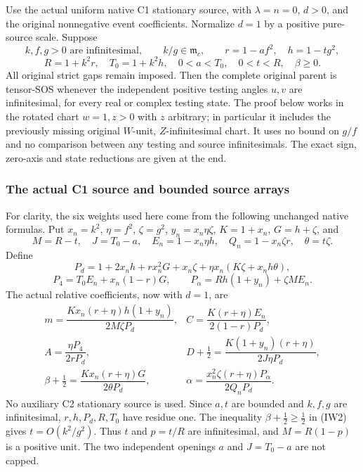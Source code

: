 Use the actual uniform native C1 stationary source, with
$\lambda=n=0$, $d>0$, and the original nonnegative event coefficients.
Normalize $d=1$ by a positive pure-source scale. Suppose
\[
 k,f,g>0\text{ are infinitesimal},\qquad k/g\in\mathfrak m_c,
 \qquad r=1-af^2,\quad h=1-tg^2,
\]
\[
 R=1+k^2r,\quad T_0=1+k^2h,\quad
 0<a<T_0,\quad 0<t<R,\quad \beta\geq0.                 \tag{IW1}
\]
All original strict gaps remain imposed. Then the complete original
parent is tensor-SOS whenever the independent positive testing angles
$u,v$ are infinitesimal, for every real or complex testing state.
The proof below works in the rotated chart $w=1,z>0$ with $z$ arbitrary;
in particular it includes the previously missing original
$W$-unit, $Z$-infinitesimal chart. It uses no bound on $g/f$ and no
comparison between any testing and source infinitesimals.
The exact sign, zero-axis and state reductions are given at the end.

\subsubsection*{The actual C1 source and bounded source arrays}

For clarity, the six weights used here come from the following
unchanged native formulas. Put $x_n=k^2$, $\eta=f^2$, $\zeta=g^2$,
$y_n=x_n\eta\zeta$, $K=1+x_n$, $G=h+\zeta$, and
\[
 M=R-t,\quad J=T_0-a,\quad E_n=1-x_n\eta h,
 \quad Q_n=1-x_n\zeta r,\quad \theta=t\zeta.
\]
Define
\[
 P_d=1+2x_nh+rx_n^2G+x_n\zeta
       +\eta x_n(K\zeta+x_nh\theta),
\]
\[
 P_4=T_0E_n+x_n(1-r)G,\qquad
 P_\alpha=Rh(1+y_n)+\zeta M E_n.
\]
The actual relative coefficients, now with $d=1$, are
\[
\begin{array}{ll}
 m=\dfrac{Kx_n(r+\eta)h(1+y_n)}{2M\zeta P_d},&
 C=\dfrac{K(r+\eta)E_n}{2(1-r)P_d},\\[4pt]
 A=\dfrac{\eta P_4}{2rP_d},&
 D+\tfrac12=\dfrac{K(1+y_n)(r+\eta)}{2J\eta P_d},\\[4pt]
 \beta+\tfrac12=\dfrac{Kx_n(r+\eta)G}{2\theta P_d},&
 \alpha=\dfrac{x_n^2\zeta(r+\eta)P_\alpha}{2Q_nP_d}.
\end{array}                                                     \tag{IW2}
\]
No auxiliary C2 stationary source is used.
Since $a,t$ are bounded and $k,f,g$ are infinitesimal,
$r,h,P_d,R,T_0$ have residue one. The inequality
$\beta+\tfrac12\geq\tfrac12$ in (IW2) gives
$t=O(k^2/g^2)$. Thus $t$ and $p=t/R$ are infinitesimal, and
$M=R(1-p)$ is a positive unit. The two independent openings
$a$ and $J=T_0-a$ are not capped.

